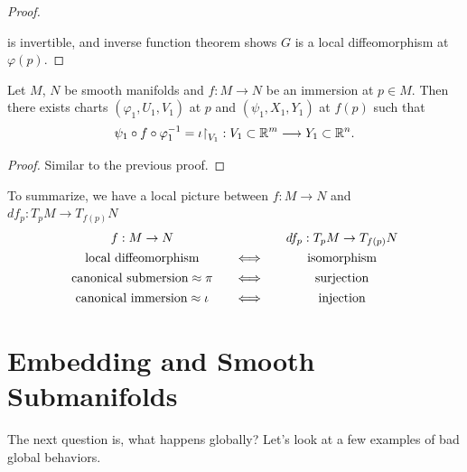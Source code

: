 \begin{proof}
\begin{center}
  \end{center}
  is invertible, and inverse function theorem shows \(G\) is a local diffeomorphism at \(\varphi(p)\).
\end{proof}

\begin{theorem}
  Let \(M\), \(N\) be smooth manifolds and \(f:M\to N\) be an immersion at \(p\in M\). Then there exists charts \((\varphi_1,U_1,V_1)\) at \(p\) and \((\psi_1,X_1,Y_1)\) at \(f(p)\) such that \[
    \psi_1\circ f\circ\varphi_1^{-1} = \iota\mathord{\upharpoonright}_{V_1}:
    V_1\subset\mathbb{R}^m\longrightarrow Y_1\subset\mathbb{R}^n.
  \]
\end{theorem}
\begin{proof}
  Similar to the previous proof.
\end{proof}

To summarize, we have a local picture between \(f:M\to N\) and \(df_p:T_pM\to T_{f(p)}N\) \[
  \begin{array}{c@{\qquad}c@{\qquad}c}
  f: M \to N & & df_p: T_pM \to T_{f(p)}N \\[4pt]
  \text{local diffeomorphism} & \Longleftrightarrow & \text{isomorphism} \\[4pt]
  \text{canonical submersion}\approx\pi & \Longleftrightarrow & \text{surjection} \\[4pt]
  \text{canonical immersion}\approx\iota & \Longleftrightarrow & \text{injection}
  \end{array}
\]

\section{Embedding and Smooth Submanifolds}
The next question is, what happens globally? Let's look at a few examples of bad global behaviors.

